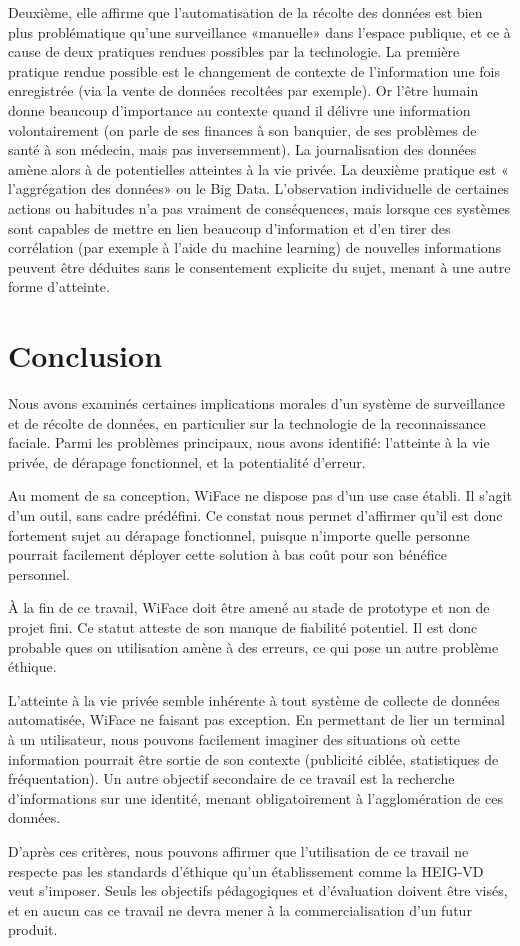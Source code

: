 Deuxième, elle affirme que l’automatisation de la récolte des données est bien plus problématique qu’une
surveillance «manuelle» dans l’espace publique, et ce à cause de deux pratiques rendues possibles par la
technologie. La première pratique rendue possible est le changement de contexte de l’information une fois
enregistrée (via la vente de données recoltées par exemple). Or l’être humain donne beaucoup d’importance au
contexte quand il délivre une information volontairement (on parle de ses finances à son banquier, de ses
problèmes de santé à son médecin, mais pas inversemment). La journalisation des données amène alors à de
potentielles atteintes à la vie privée. La deuxième pratique est « l’aggrégation des données» ou le Big Data.
L’observation individuelle de certaines actions ou habitudes n’a pas vraiment de conséquences, mais lorsque ces
systèmes sont capables de mettre en lien beaucoup d’information et d’en tirer des corrélation (par exemple à l’aide
du machine learning) de nouvelles informations peuvent être déduites sans le consentement explicite du sujet,
menant à une autre forme d’atteinte.

\section{Conclusion}
Nous avons examinés certaines implications morales d’un système de surveillance et de récolte de données, en
particulier sur la technologie de la reconnaissance faciale. Parmi les problèmes principaux, nous avons identifié:
l’atteinte à la vie privée, de dérapage fonctionnel, et la potentialité d’erreur.

Au moment de sa conception, WiFace ne dispose pas d’un use case établi. Il s’agit d’un outil, sans cadre prédéfini.
Ce constat nous permet d’affirmer qu’il est donc fortement sujet au dérapage fonctionnel, puisque n’importe quelle
personne pourrait facilement déployer cette solution à bas coût pour son bénéfice personnel.

À la fin de ce travail, WiFace doit être amené au stade de prototype et non de projet fini. Ce statut atteste de son
manque de fiabilité potentiel. Il est donc probable ques on utilisation amène à des erreurs, ce qui pose un autre
problème éthique.

L’atteinte à la vie privée semble inhérente à tout système de collecte de données automatisée, WiFace ne faisant
pas exception. En permettant de lier un terminal à un utilisateur, nous pouvons facilement imaginer des situations
où cette information pourrait être sortie de son contexte (publicité ciblée, statistiques de fréquentation). Un autre
objectif secondaire de ce travail est la recherche d’informations sur une identité, menant obligatoirement à
l’agglomération de ces données.

D’après ces critères, nous pouvons affirmer que l’utilisation de ce travail ne respecte pas les standards d’éthique
qu’un établissement comme la HEIG-VD veut s’imposer. Seuls les objectifs pédagogiques et d’évaluation doivent
être visés, et en aucun cas ce travail ne devra mener à la commercialisation d’un futur produit.

